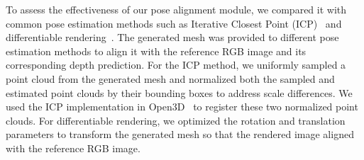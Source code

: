 To assess the effectiveness of our pose alignment module, we compared it with common pose estimation methods such as Iterative Closest Point (ICP)~\cite{arun1987least,best1992method} and differentiable rendering~\cite{nvdiffrast}. The generated mesh was provided to different pose estimation methods to align it with the reference RGB image and its corresponding depth prediction.
For the ICP method, we uniformly sampled a point cloud from the generated mesh and normalized both the sampled and estimated point clouds by their bounding boxes to address scale differences. We used the ICP implementation in Open3D~\cite{Zhou2018Open3DAM} to register these two normalized point clouds.
For differentiable rendering, we optimized the rotation and translation parameters to transform the generated mesh so that the rendered image aligned with the reference RGB image.
